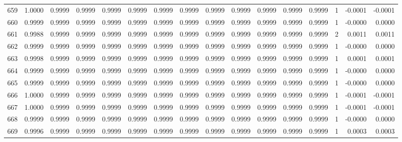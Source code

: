 \begin{tabular}{lrrrrrrrrrrrrrrr}
659 &      1.0000 &  0.9999 &  0.9999 &  0.9999 &  0.9999 &  0.9999 &  0.9999 &  0.9999 &  0.9999 &  0.9999 &   0.9999 &     0.9999 &      1 &                   -0.0001 &                    -0.0001 \\
660 &      0.9999 &  0.9999 &  0.9999 &  0.9999 &  0.9999 &  0.9999 &  0.9999 &  0.9999 &  0.9999 &  0.9999 &   0.9999 &     0.9999 &      1 &                   -0.0000 &                     0.0000 \\
661 &      0.9988 &  0.9999 &  0.9999 &  0.9999 &  0.9999 &  0.9999 &  0.9999 &  0.9999 &  0.9999 &  0.9999 &   0.9999 &     0.9999 &      2 &                    0.0011 &                     0.0011 \\
662 &      0.9999 &  0.9999 &  0.9999 &  0.9999 &  0.9999 &  0.9999 &  0.9999 &  0.9999 &  0.9999 &  0.9999 &   0.9999 &     0.9999 &      1 &                   -0.0000 &                     0.0000 \\
663 &      0.9998 &  0.9999 &  0.9999 &  0.9999 &  0.9999 &  0.9999 &  0.9999 &  0.9999 &  0.9999 &  0.9999 &   0.9999 &     0.9999 &      1 &                    0.0001 &                     0.0001 \\
664 &      0.9999 &  0.9999 &  0.9999 &  0.9999 &  0.9999 &  0.9999 &  0.9999 &  0.9999 &  0.9999 &  0.9999 &   0.9999 &     0.9999 &      1 &                   -0.0000 &                     0.0000 \\
665 &      0.9999 &  0.9999 &  0.9999 &  0.9999 &  0.9999 &  0.9999 &  0.9999 &  0.9999 &  0.9999 &  0.9999 &   0.9999 &     0.9999 &      1 &                   -0.0000 &                     0.0000 \\
666 &      1.0000 &  0.9999 &  0.9999 &  0.9999 &  0.9999 &  0.9999 &  0.9999 &  0.9999 &  0.9999 &  0.9999 &   0.9999 &     0.9999 &      1 &                   -0.0001 &                    -0.0001 \\
667 &      1.0000 &  0.9999 &  0.9999 &  0.9999 &  0.9999 &  0.9999 &  0.9999 &  0.9999 &  0.9999 &  0.9999 &   0.9999 &     0.9999 &      1 &                   -0.0001 &                    -0.0001 \\
668 &      0.9999 &  0.9999 &  0.9999 &  0.9999 &  0.9999 &  0.9999 &  0.9999 &  0.9999 &  0.9999 &  0.9999 &   0.9999 &     0.9999 &      1 &                   -0.0000 &                     0.0000 \\
669 &      0.9996 &  0.9999 &  0.9999 &  0.9999 &  0.9999 &  0.9999 &  0.9999 &  0.9999 &  0.9999 &  0.9999 &   0.9999 &     0.9999 &      1 &                    0.0003 &                     0.0003 \\

\end{tabular}
